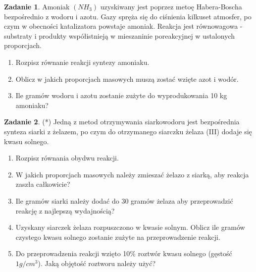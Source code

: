 \documentclass[11pt]{article}
\theoremstyle{definition}
\newtheorem{zad}{Zadanie}
\numberwithin{zad}{section}
\begin{document}
\begin{zad}
Amoniak $(NH_3)$ uzyskiwany jest poprzez metoę Habera-Boscha bezpośrednio z wodoru i azotu. Gazy spręża się do ciśnienia kilkuset atmosfer, po czym w obecności katalizatora powstaje amoniak. Reakcja jest równowagowa - substraty i produkty współistnieją w mieszaninie poreakcyjnej w ustalonych proporcjach.

\begin{enumerate}
\item Rozpisz równanie reakcji syntezy amoniaku.
\item Oblicz w jakich proporcjach masowych muszą zostać wzięte azot i wodór.
\item Ile gramów wodoru i azotu zostanie zużyte do wyprodukowania 10 kg amoniaku?
\end{enumerate}
\end{zad}

\begin{zad}
(*) Jedną z metod otrzymywania siarkowodoru jest bezpośrednia synteza siarki z żelazem, po czym do otrzymanego siarczku żelaza (III) dodaje się kwasu solnego.
\begin{enumerate}
\item Rozpisz równania obydwu reakcji.
\item W jakich proporcjach masowych należy zmieszać żelazo z siarką, aby reakcja zaszła całkowicie?
\item Ile gramów siarki należy dodać do 30 gramów żelaza aby przeprowadzić reakcję z najlepszą wydajnością?
\item Uzyskany siarczek żelaza rozpuszczono w kwasie solnym. Oblicz ile gramów czystego kwasu solnego zostanie zużyte na przeprowadzenie reakcji.
\item Do przeprowadzenia reakcji wzięto 10\% roztwór kwasu solnego (gęstość $1 g/cm^3$).  Jaką objętość roztworu należy użyć?
\end{enumerate}
\end{zad}
\end{document}
